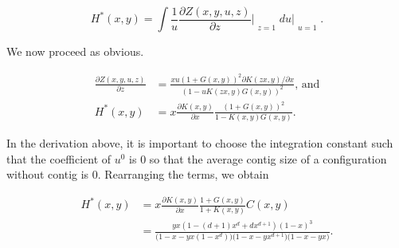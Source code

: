 \documentclass{article}
\begin{document}
\begin{equation*}
H^*(x,y) = \int \frac{1}{u}
\frac{\partial Z(x,y,u,z)}{\partial z}\Bigr|_{\substack{\\z=1}} du
\biggr|_{\substack{\\u=1}}.
\end{equation*}

We now proceed as obvious.

\begin{equation*}
\begin{split}
\frac{\partial Z(x,y,u,z)}{\partial z} &=
\frac{xu\left(1+G(x,y)\right)^2 \partial K(zx,y)/ \partial x}
{\left(1-uK(zx,y)G(x,y)\right)^2} \text{, and} \\
H^*(x,y) &=  x \frac{\partial K(x,y)}{\partial x}
\frac{\left(1+G(x,y)\right)^2}{1-K(x,y)G(x,y)}.
\end{split}
\end{equation*}

In the derivation above, it is important to choose the integration
constant such that the coefficient of $u^0$ is $0$ so that the average
contig size of a configuration without contig is $0$. Rearranging the
terms, we obtain

\begin{equation*}
\begin{split}
H^*(x,y) &= x \frac{\partial K(x,y)}{\partial x}
\frac{1+G(x,y)}{1+K(x,y)}C(x,y) \\
&= \frac{yx(1-(d+1)x^d+dx^{d+1})(1-x)^3}
{\big(1-x-yx(1-x^d)\big)\big(1-x-yx^{d+1}\big)\big(1-x-yx\big)}.
\end{split}
\end{equation*}
\end{document}
